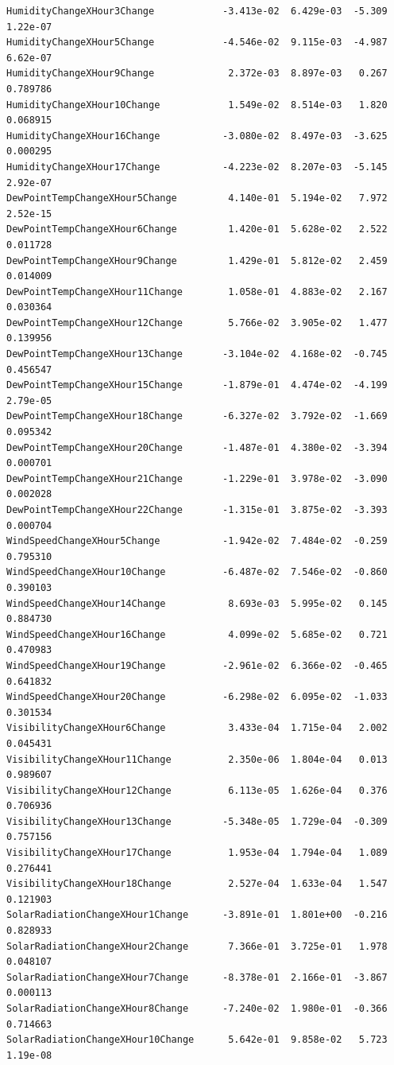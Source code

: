 \documentclass[
  letterpaper,
  DIV=11,
  numbers=noendperiod]{scrartcl}
\begin{document}
\begin{verbatim}
HumidityChangeXHour3Change            -3.413e-02  6.429e-03  -5.309 1.22e-07
HumidityChangeXHour5Change            -4.546e-02  9.115e-03  -4.987 6.62e-07
HumidityChangeXHour9Change             2.372e-03  8.897e-03   0.267 0.789786
HumidityChangeXHour10Change            1.549e-02  8.514e-03   1.820 0.068915
HumidityChangeXHour16Change           -3.080e-02  8.497e-03  -3.625 0.000295
HumidityChangeXHour17Change           -4.223e-02  8.207e-03  -5.145 2.92e-07
DewPointTempChangeXHour5Change         4.140e-01  5.194e-02   7.972 2.52e-15
DewPointTempChangeXHour6Change         1.420e-01  5.628e-02   2.522 0.011728
DewPointTempChangeXHour9Change         1.429e-01  5.812e-02   2.459 0.014009
DewPointTempChangeXHour11Change        1.058e-01  4.883e-02   2.167 0.030364
DewPointTempChangeXHour12Change        5.766e-02  3.905e-02   1.477 0.139956
DewPointTempChangeXHour13Change       -3.104e-02  4.168e-02  -0.745 0.456547
DewPointTempChangeXHour15Change       -1.879e-01  4.474e-02  -4.199 2.79e-05
DewPointTempChangeXHour18Change       -6.327e-02  3.792e-02  -1.669 0.095342
DewPointTempChangeXHour20Change       -1.487e-01  4.380e-02  -3.394 0.000701
DewPointTempChangeXHour21Change       -1.229e-01  3.978e-02  -3.090 0.002028
DewPointTempChangeXHour22Change       -1.315e-01  3.875e-02  -3.393 0.000704
WindSpeedChangeXHour5Change           -1.942e-02  7.484e-02  -0.259 0.795310
WindSpeedChangeXHour10Change          -6.487e-02  7.546e-02  -0.860 0.390103
WindSpeedChangeXHour14Change           8.693e-03  5.995e-02   0.145 0.884730
WindSpeedChangeXHour16Change           4.099e-02  5.685e-02   0.721 0.470983
WindSpeedChangeXHour19Change          -2.961e-02  6.366e-02  -0.465 0.641832
WindSpeedChangeXHour20Change          -6.298e-02  6.095e-02  -1.033 0.301534
VisibilityChangeXHour6Change           3.433e-04  1.715e-04   2.002 0.045431
VisibilityChangeXHour11Change          2.350e-06  1.804e-04   0.013 0.989607
VisibilityChangeXHour12Change          6.113e-05  1.626e-04   0.376 0.706936
VisibilityChangeXHour13Change         -5.348e-05  1.729e-04  -0.309 0.757156
VisibilityChangeXHour17Change          1.953e-04  1.794e-04   1.089 0.276441
VisibilityChangeXHour18Change          2.527e-04  1.633e-04   1.547 0.121903
SolarRadiationChangeXHour1Change      -3.891e-01  1.801e+00  -0.216 0.828933
SolarRadiationChangeXHour2Change       7.366e-01  3.725e-01   1.978 0.048107
SolarRadiationChangeXHour7Change      -8.378e-01  2.166e-01  -3.867 0.000113
SolarRadiationChangeXHour8Change      -7.240e-02  1.980e-01  -0.366 0.714663
SolarRadiationChangeXHour10Change      5.642e-01  9.858e-02   5.723 1.19e-08

\end{verbatim}
\end{document}
